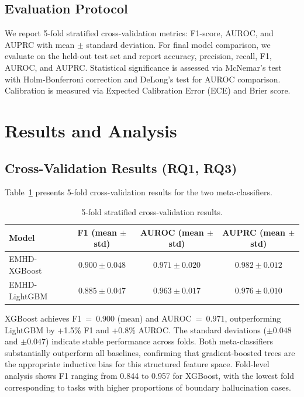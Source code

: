 \documentclass[runningheads]{llncs}
\begin{document}
\subsection{Evaluation Protocol}

We report 5-fold stratified cross-validation metrics: F1-score, AUROC, and AUPRC with mean $\pm$ standard deviation. For final model comparison, we evaluate on the held-out test set and report accuracy, precision, recall, F1, AUROC, and AUPRC. Statistical significance is assessed via McNemar's test with Holm-Bonferroni correction and DeLong's test for AUROC comparison. Calibration is measured via Expected Calibration Error (ECE) and Brier score.


\section{Results and Analysis}
\label{sec:results}

\subsection{Cross-Validation Results (RQ1, RQ3)}

Table~\ref{tab:cv} presents 5-fold cross-validation results for the two meta-classifiers.

\begin{table}[t]
\centering
\caption{5-fold stratified cross-validation results.}
\label{tab:cv}
\begin{tabular}{lccc}
\toprule
\textbf{Model} & \textbf{F1 (mean $\pm$ std)} & \textbf{AUROC (mean $\pm$ std)} & \textbf{AUPRC (mean $\pm$ std)} \\
\midrule
EMHD-XGBoost  & $\mathbf{0.900 \pm 0.048}$ & $\mathbf{0.971 \pm 0.020}$ & $\mathbf{0.982 \pm 0.012}$ \\
EMHD-LightGBM & $0.885 \pm 0.047$ & $0.963 \pm 0.017$ & $0.976 \pm 0.010$ \\
\bottomrule
\end{tabular}
\end{table}

XGBoost achieves F1~=~$0.900$ (mean) and AUROC~=~$0.971$, outperforming LightGBM by +1.5\% F1 and +0.8\% AUROC. The standard deviations ($\pm 0.048$ and $\pm 0.047$) indicate stable performance across folds. Both meta-classifiers substantially outperform all baselines, confirming that gradient-boosted trees are the appropriate inductive bias for this structured feature space. Fold-level analysis shows F1 ranging from 0.844 to 0.957 for XGBoost, with the lowest fold corresponding to tasks with higher proportions of boundary hallucination cases.
\end{document}
